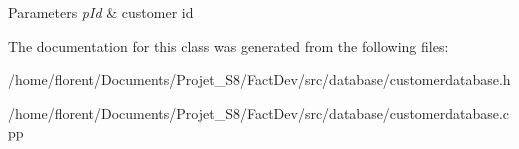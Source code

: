 \begin{DoxyParams}{Parameters}
{\em p\-Id} & customer id \\
\hline
\end{DoxyParams}


The documentation for this class was generated from the following files\-:\begin{DoxyCompactItemize}
\item 
/home/florent/\-Documents/\-Projet\-\_\-\-S8/\-Fact\-Dev/src/database/customerdatabase.\-h\item 
/home/florent/\-Documents/\-Projet\-\_\-\-S8/\-Fact\-Dev/src/database/customerdatabase.\-cpp\end{DoxyCompactItemize}
